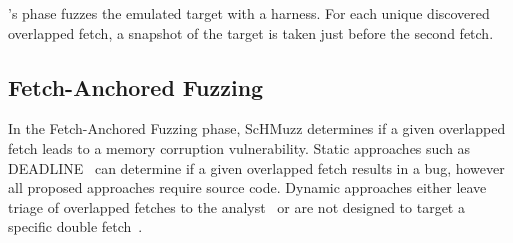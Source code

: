 \documentclass[conference]{IEEEtran} %
\newcommand{\sysname}{ScHMuzz\xspace}
\newcommand{\stageone}{Exploration\xspace}
\newcommand{\stagetwo}{Fetch-Anchored Fuzzing\xspace} %
\providecommand{\DIFdeltex}[1]{{\protect\color{red} \scriptsize #1}} %
\providecommand{\DIFdelbegin}{} %
\providecommand{\DIFdelend}{} %
\providecommand{\DIFdel}[1]{\texorpdfstring{\DIFdeltex{#1}}{}} %
\begin{document}
\DIFdelbegin %
\DIFdel{'s }%
\DIFdel{phase fuzzes the emulated target with a harness. For each unique discovered overlapped fetch, 
    a snapshot of the target is taken just before the second fetch.  
}%
\DIFdelend %

\subsection{\stagetwo}
In the \stagetwo phase, \sysname determines if a given overlapped fetch leads to a memory corruption vulnerability. 
Static approaches such as DEADLINE~\cite{deadline} 
can determine if a given overlapped fetch results in a bug, however all proposed 
approaches require source code. Dynamic approaches  
either leave triage of overlapped fetches to the analyst~\cite{bochspwn} or are 
not designed to target a specific double fetch~\cite{decaf,chen2024enclavefuzz,morphuzz}.
\end{document}
